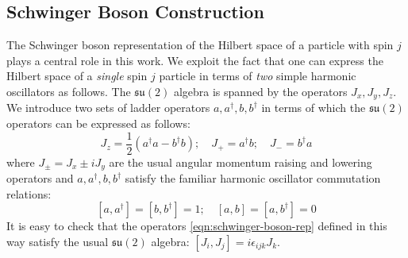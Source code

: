 \documentclass[twocolumn,draft,aps,nofootinbib,nobibnotes,final]{revtex4-2}
\newcommand{\mf}[1]{\mathfrak{#1}}
\newcommand{\onehalf}{\frac{1}{2}}
\begin{document}
\subsection{Schwinger Boson Construction }\label{sec:schwinger-boson}

The Schwinger boson representation of the Hilbert space of a particle with spin $ j $ plays a central role in this work. We exploit the fact that one can express the Hilbert space of a \textit{single} spin $ j $ particle in terms of \textit{two} simple harmonic oscillators as follows. The $ \mf{su}(2) $ algebra is spanned by the operators $ J_x, J_y, J_z $. We introduce two sets of ladder operators $ a, a^\dag, b, b^\dag $ in terms of which the $ \mf{su}(2) $ operators can be expressed as follows:
\begin{equation}\label{eqn:schwinger-boson-rep}
	J_z = \onehalf (a^\dag a - b^\dag b); \quad J_+ = a^\dag b; \quad J_- = b^\dag a
\end{equation}
where $ J_{\pm} = J_x \pm i J_y $ are the usual angular momentum raising and lowering operators and $ a,a^\dag, b, b^\dag $ satisfy the familiar harmonic oscillator commutation relations:
\begin{equation}\label{eqn:sho-commutator}
	[a,a^\dag] = [b, b^\dag] = 1; \quad [a,b] =  [a, b^\dag] = 0
\end{equation}
It is easy to check that the operators \eqref{eqn:schwinger-boson-rep} defined in this way satisfy the usual $ \mf{su}(2) $ algebra: $ [J_i, J_j] = i \epsilon_{ijk} J_k $.
\end{document}
